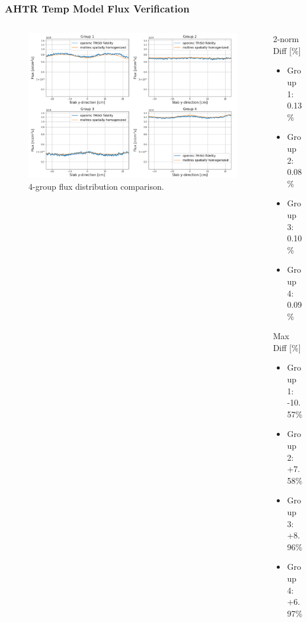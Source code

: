 \begin{frame}
    \frametitle{AHTR Temp Model Flux Verification}
    \begin{columns}
    \begin{column}{0.7\textwidth}
    \begin{figure}[]
        \centering
        \includegraphics[width=\linewidth]{figures/benchmark-flux.png} 
        \caption{4-group flux distribution comparison.}
    \end{figure}
    \end{column}
    \begin{column}{0.3\textwidth}
        2-norm Diff [\%]
        \begin{itemize}
            \item Group 1: 0.13\% 
            \item Group 2: 0.08\% 
            \item Group 3: 0.10\% 
            \item Group 4: 0.09\%
        \end{itemize}
        Max Diff [\%]
        \begin{itemize}
            \item Group 1: -10.57\% 
            \item Group 2: +7.58\% 
            \item Group 3: +8.96\% 
            \item Group 4: +6.97\%
        \end{itemize}
    \end{column}
    \end{columns}
\end{frame}

